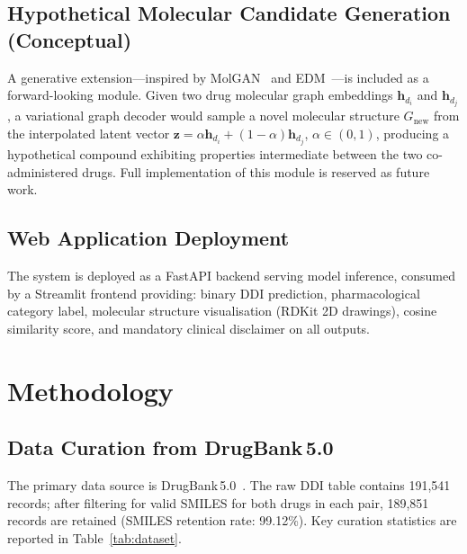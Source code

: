 \documentclass[conference]{IEEEtran}
\begin{document}
\subsection{Hypothetical Molecular Candidate Generation (Conceptual)}

A generative extension---inspired by MolGAN~\cite{decao2018molgan} and
EDM~\cite{hoogeboom2022edm}---is included as a forward-looking module. Given two drug
molecular graph embeddings $\mathbf{h}_{d_i}$ and $\mathbf{h}_{d_j}$, a variational
graph decoder would sample a novel molecular structure $G_{\mathrm{new}}$ from the
interpolated latent vector $\mathbf{z} = \alpha\mathbf{h}_{d_i} +
(1-\alpha)\mathbf{h}_{d_j}$, $\alpha \in (0,1)$, producing a hypothetical compound
exhibiting properties intermediate between the two co-administered drugs. Full
implementation of this module is reserved as future work.

\subsection{Web Application Deployment}

The system is deployed as a FastAPI backend serving model inference, consumed by a
Streamlit frontend providing: binary DDI prediction, pharmacological category label,
molecular structure visualisation (RDKit 2D drawings), cosine similarity score, and
mandatory clinical disclaimer on all outputs.

\section{Methodology}
\label{sec:method}

\subsection{Data Curation from DrugBank\,5.0}

The primary data source is DrugBank\,5.0~\cite{wishart2018drugbank5}. The raw DDI table
contains 191,541 records; after filtering for valid SMILES for both drugs in each pair,
189,851 records are retained (SMILES retention rate: 99.12\%). Key curation statistics
are reported in Table~\ref{tab:dataset}.
\end{document}
